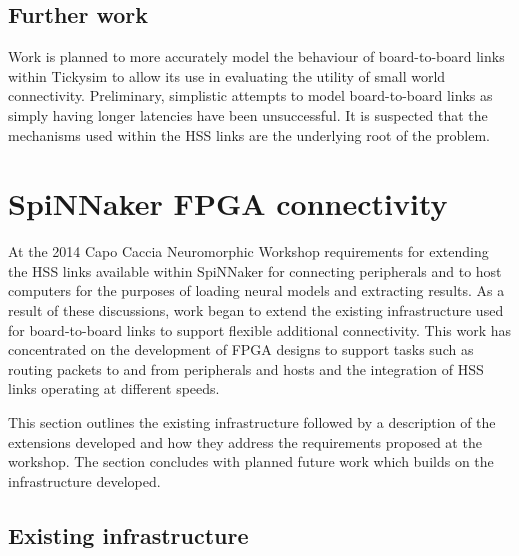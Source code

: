 		\subsection{Further work}
			
			
			Work is planned to more accurately model the behaviour of board-to-board
			links within Tickysim to allow its use in evaluating the utility of small
			world connectivity. Preliminary, simplistic attempts to model
			board-to-board links as simply having longer latencies have been
			unsuccessful. It is suspected that the mechanisms used within the HSS
			links are the underlying root of the problem.
	
	
	\section{SpiNNaker FPGA connectivity}
		
		
		At the 2014 Capo Caccia Neuromorphic Workshop requirements for extending the
		HSS links available within SpiNNaker for connecting peripherals and to host
		computers for the purposes of loading neural models and extracting results.
		As a result of these discussions, work began to extend the existing
		infrastructure used for board-to-board links to support flexible additional
		connectivity. This work has concentrated on the development of FPGA designs
		to support tasks such as routing packets to and from peripherals and hosts
		and the integration of HSS links operating at different speeds.
		
		This section outlines the existing infrastructure followed by a description
		of the extensions developed and how they address the requirements proposed
		at the workshop. The section concludes with planned future work which builds
		on the infrastructure developed.
		
			\subsection{Existing infrastructure}
				
